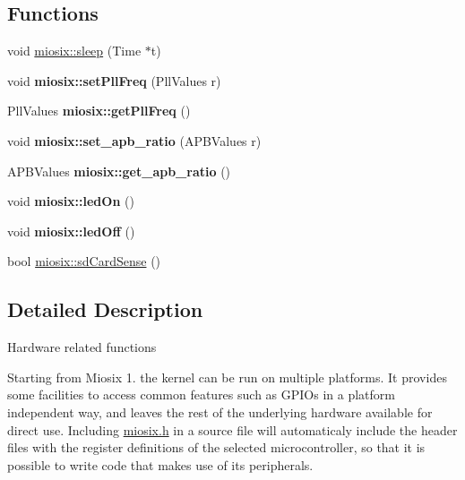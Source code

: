 \subsection*{Functions}
\begin{DoxyCompactItemize}
\item 
void \hyperlink{group___hardware_ga030255d7e5175ed1ab2c4ce48276ef23}{miosix\-::sleep} (Time $\ast$t)
\item 
\hypertarget{group___hardware_ga754a5465a237b59fe4c938804115e501}{void {\bfseries miosix\-::set\-Pll\-Freq} (Pll\-Values r)}\label{group___hardware_ga754a5465a237b59fe4c938804115e501}

\item 
\hypertarget{group___hardware_ga05de6820e307a66d6d5ef359ed869479}{Pll\-Values {\bfseries miosix\-::get\-Pll\-Freq} ()}\label{group___hardware_ga05de6820e307a66d6d5ef359ed869479}

\item 
\hypertarget{group___hardware_ga7c445244914cd7af079ac29fed41ecd6}{void {\bfseries miosix\-::set\-\_\-apb\-\_\-ratio} (A\-P\-B\-Values r)}\label{group___hardware_ga7c445244914cd7af079ac29fed41ecd6}

\item 
\hypertarget{group___hardware_ga7b210ba2df2b14811be3b416c0243e76}{A\-P\-B\-Values {\bfseries miosix\-::get\-\_\-apb\-\_\-ratio} ()}\label{group___hardware_ga7b210ba2df2b14811be3b416c0243e76}

\item 
\hypertarget{group___hardware_gae1c05bf01644e238fbae56e5d6f23e8b}{void {\bfseries miosix\-::led\-On} ()}\label{group___hardware_gae1c05bf01644e238fbae56e5d6f23e8b}

\item 
\hypertarget{group___hardware_ga7ece6a6978a1d814979dcaadd7498edb}{void {\bfseries miosix\-::led\-Off} ()}\label{group___hardware_ga7ece6a6978a1d814979dcaadd7498edb}

\item 
bool \hyperlink{group___hardware_ga4a7aa35796ec8da996784c562b9e12ac}{miosix\-::sd\-Card\-Sense} ()
\end{DoxyCompactItemize}


\subsection{Detailed Description}
Hardware related functions

Starting from Miosix 1. the kernel can be run on multiple platforms. It provides some facilities to access common features such as G\-P\-I\-Os in a platform independent way, and leaves the rest of the underlying hardware available for direct use. Including \hyperlink{miosix_8h_source}{miosix.\-h} in a source file will automaticaly include the header files with the register definitions of the selected microcontroller, so that it is possible to write code that makes use of its peripherals.

